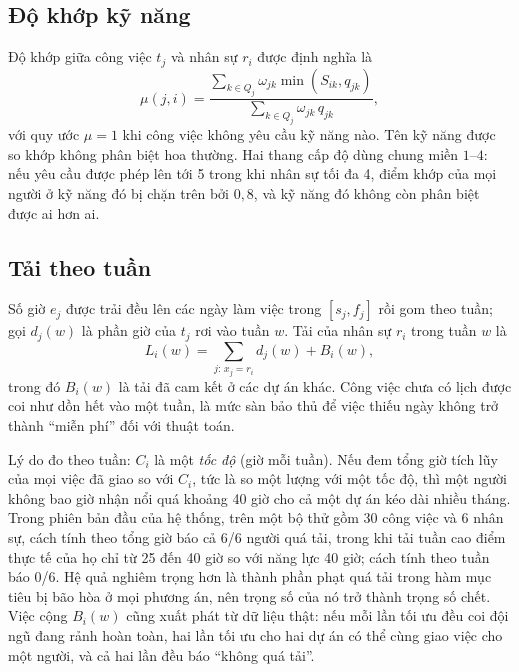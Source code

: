 \documentclass{IEEEtran}
\begin{document}
\subsection{Độ khớp kỹ năng}

Độ khớp giữa công việc $t_j$ và nhân sự $r_i$ được định nghĩa là
\begin{equation}
\mu(j,i)=\frac{\sum_{k\in Q_j}\omega_{jk}\min(S_{ik},q_{jk})}{\sum_{k\in Q_j}\omega_{jk}\,q_{jk}},
\label{eq:skill}
\end{equation}
với quy ước $\mu=1$ khi công việc không yêu cầu kỹ năng nào. Tên kỹ năng được so khớp không phân biệt hoa thường. Hai thang cấp độ dùng chung miền $1$--$4$: nếu yêu cầu được phép lên tới 5 trong khi nhân sự tối đa 4, điểm khớp của mọi người ở kỹ năng đó bị chặn trên bởi $0{,}8$, và kỹ năng đó không còn phân biệt được ai hơn ai.

\subsection{Tải theo tuần}

Số giờ $e_j$ được trải đều lên các ngày làm việc trong $[s_j,f_j]$ rồi gom theo tuần; gọi $d_j(w)$ là phần giờ của $t_j$ rơi vào tuần $w$. Tải của nhân sự $r_i$ trong tuần $w$ là
\begin{equation}
L_i(w)=\sum_{j:\,x_j=r_i} d_j(w) + B_i(w),
\label{eq:load}
\end{equation}
trong đó $B_i(w)$ là tải đã cam kết ở các dự án khác. Công việc chưa có lịch được coi như dồn hết vào một tuần, là mức sàn bảo thủ để việc thiếu ngày không trở thành ``miễn phí'' đối với thuật toán.

Lý do đo theo tuần: $C_i$ là một \emph{tốc độ} (giờ mỗi tuần). Nếu đem tổng giờ tích lũy của mọi việc đã giao so với $C_i$, tức là so một lượng với một tốc độ, thì một người không bao giờ nhận nổi quá khoảng 40 giờ cho cả một dự án kéo dài nhiều tháng. Trong phiên bản đầu của hệ thống, trên một bộ thử gồm 30 công việc và 6 nhân sự, cách tính theo tổng giờ báo cả 6/6 người quá tải, trong khi tải tuần cao điểm thực tế của họ chỉ từ 25 đến 40 giờ so với năng lực 40 giờ; cách tính theo tuần báo 0/6. Hệ quả nghiêm trọng hơn là thành phần phạt quá tải trong hàm mục tiêu bị bão hòa ở mọi phương án, nên trọng số của nó trở thành trọng số chết. Việc cộng $B_i(w)$ cũng xuất phát từ dữ liệu thật: nếu mỗi lần tối ưu đều coi đội ngũ đang rảnh hoàn toàn, hai lần tối ưu cho hai dự án có thể cùng giao việc cho một người, và cả hai lần đều báo ``không quá tải''.
\end{document}
